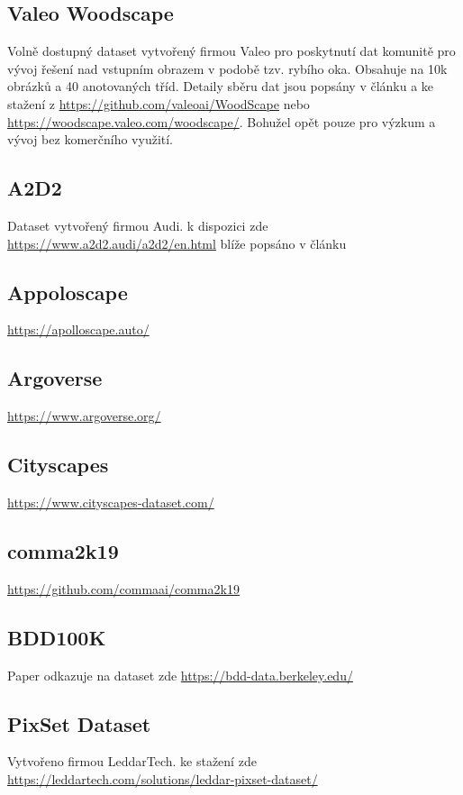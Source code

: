 \documentclass[czech, bc, kky, he, iso690alph]{fasthesis}
\begin{document}
    		\subsection{Valeo Woodscape}
    			Volně dostupný dataset vytvořený firmou Valeo pro poskytnutí dat komunitě pro vývoj řešení nad vstupním obrazem v podobě tzv. rybího oka. Obsahuje na 10k obrázků a 40 anotovaných tříd. Detaily sběru dat jsou popsány v článku \cite{woodscape} a ke stažení z \href{https://github.com/valeoai/WoodScape}{https://github.com/valeoai/WoodScape} nebo \href{https://woodscape.valeo.com/woodscape/}{https://woodscape.valeo.com/woodscape/}. Bohužel opět pouze pro výzkum a vývoj bez komerčního využití.
    		\subsection{A2D2}
    			Dataset vytvořený firmou Audi. k dispozici zde \href{https://www.a2d2.audi/a2d2/en.html}{https://www.a2d2.audi/a2d2/en.html} blíže popsáno v článku \cite{a2d2}
    		\subsection{Appoloscape}
    			\href{https://apolloscape.auto/}{https://apolloscape.auto/}
    		\subsection{Argoverse}
    			\href{https://www.argoverse.org/}{https://www.argoverse.org/}
   			\subsection{Cityscapes}
   				\href{https://www.cityscapes-dataset.com/}{https://www.cityscapes-dataset.com/}
  			\subsection{comma2k19}
  				\href{https://github.com/commaai/comma2k19}{https://github.com/commaai/comma2k19}
  			\subsection{BDD100K}
  				Paper \cite{bdd100k} odkazuje na dataset zde \href{https://bdd-data.berkeley.edu/}{https://bdd-data.berkeley.edu/}
  			\subsection{PixSet Dataset}
  				Vytvořeno firmou LeddarTech. ke stažení zde \href{https://leddartech.com/solutions/leddar-pixset-dataset/}{https://leddartech.com/solutions/leddar-pixset-dataset/}
\end{document}
